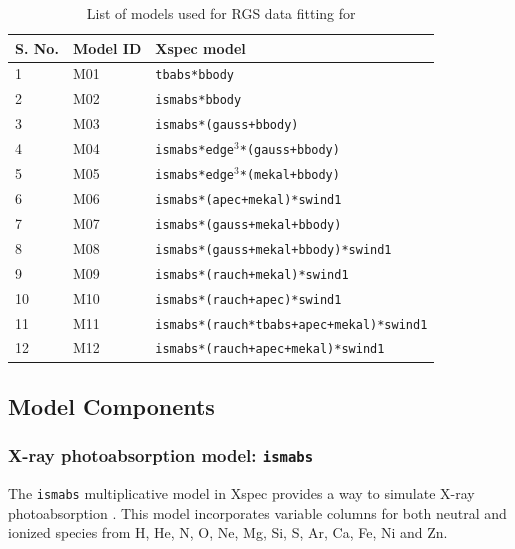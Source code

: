		\begin{table}[h!]
			\centering
			\caption{List of models used for RGS data fitting for \source}
			\label{xmm-rgs-model-list}
			\begin{tabular}{lll}
				\hline
				\textbf{S. No.} & \textbf{Model ID} & \textbf{Xspec model} \\ \hline
				{1} & {M01} & \texttt{tbabs*bbody} \\ %
				{2} & {M02} & \texttt{ismabs*bbody} \\ %
				{3} & {M03} & \texttt{ismabs*(gauss+bbody)} \\ %
				{4} & {M04} & \texttt{ismabs*edge$^3$*(gauss+bbody)} \\ %
				{5} & {M05} & \texttt{ismabs*edge$^3$*(mekal+bbody)} \\ %
				{6} & {M06} & \texttt{ismabs*(apec+mekal)*swind1} \\ %
				{7} & {M07} & \texttt{ismabs*(gauss+mekal+bbody)} \\ %
				{8} & {M08} & \texttt{ismabs*(gauss+mekal+bbody)*swind1} \\ %
				{9} & {M09} & \texttt{ismabs*(rauch+mekal)*swind1} \\ %
				{10} & {M10} & \texttt{ismabs*(rauch+apec)*swind1} \\ %
				{11} & {M11} & \texttt{ismabs*(rauch*tbabs+apec+mekal)*swind1} \\ %
				{12} & {M12} & \texttt{ismabs*(rauch+apec+mekal)*swind1} \\ \hline
			\end{tabular}
		\end{table}
	
		\subsection{Model Components} \label{hi-resolution:models:components}
		
			\subsubsection{X-ray photoabsorption model: \texttt{ismabs}}
			The \texttt{ismabs} multiplicative model in Xspec provides a way to simulate X-ray photoabsorption \cite{ismabs_gatuzz}. This model incorporates variable columns for both neutral and ionized species from H, He, N, O, Ne, Mg, Si, S, Ar, Ca, Fe, Ni and Zn.
			
